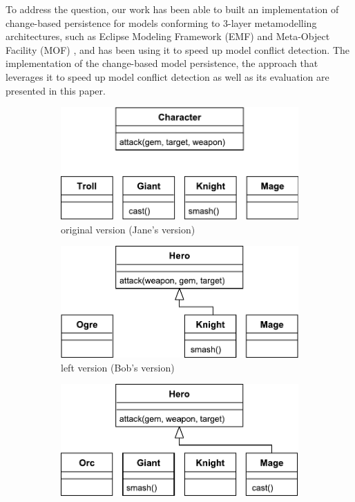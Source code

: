 To address the question, our work has been able to built an implementation of change-based persistence for models conforming to 3-layer metamodelling architectures, such as Eclipse Modeling Framework (EMF) \cite{eclipse2019emf} and Meta-Object Facility (MOF) \cite{omg2018mof}, and has been using it to speed up model conflict detection. The implementation of the change-based model persistence, the approach that leverages it to speed up model conflict detection as well as its evaluation are presented in this paper. 

\begin{figure}[t]
  \centering
  \begin{subfigure}[t]{0.31\linewidth}
    \includegraphics[width=\linewidth]{class_diagram_origin}
    \caption{original version (Jane's version)}
    \label{fig:class_diagram_origin}
  \end{subfigure}
  \hfill
  \begin{subfigure}[t]{0.31\linewidth}
    \includegraphics[width=\linewidth]{class_diagram_left}
    \caption{left version (Bob's version)}
    \label{fig:class_diagram_left}
  \end{subfigure}
  \hfill
  \begin{subfigure}[t]{0.31\linewidth}
    \includegraphics[width=\linewidth]{class_diagram_right}

\end{subfigure}
\end{figure}
